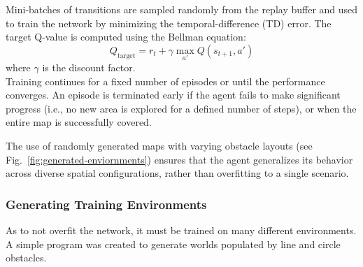 Mini-batches of transitions are sampled randomly from the replay buffer and used to train the network by minimizing the temporal-difference (TD) error. The target Q-value is computed using the Bellman equation:
$$Q_{\text{target}} = r_t + \gamma \max_{a'} Q(s_{t+1}, a')$$
where $\gamma$ is the discount factor.\\

Training continues for a fixed number of episodes or until the performance converges. An episode is terminated early if the agent fails to make significant progress (i.e., no new area is explored for a defined number of steps), or when the entire map is successfully covered.

The use of randomly generated maps with varying obstacle layouts (see Fig.~\ref{fig:generated-enviornments}) ensures that the agent generalizes its behavior across diverse spatial configurations, rather than overfitting to a single scenario.

\subsubsection{Generating Training Environments}
As to not overfit the network, it must be trained on many different environments. A simple program was created to generate worlds populated by line and circle obstacles.

